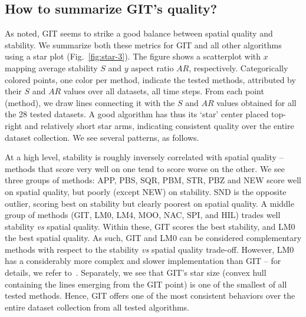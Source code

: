 \subsection{How to summarize GIT's quality?}
%
As noted, GIT seems to strike a good balance between spatial quality and stability. We summarize both these metrics for GIT and all other algorithms using a star plot (Fig.~\ref{fig:star-3}). The figure shows a scatterplot with $x$ mapping average stability $S$ and $y$ aspect ratio $AR$, respectively. Categorically colored points, one color per method, indicate the tested methods, attributed by their $S$ and $AR$ values over all datasets, all time steps. From each point (method), we draw lines connecting it with the $S$ and $AR$ values obtained for all the 28 tested datasets. A good algorithm has thus its `star' center placed top-right and relatively short star arms, indicating consistent quality over the entire dataset collection. We see several patterns, as follows.

At a high level, stability is roughly inversely correlated with spatial quality -- methods that score very well on one tend to score worse on the other. We see three groups of methods: APP, PBS, SQR, PBM, STR, PBZ and NEW score well on spatial quality, but poorly (except NEW) on stability. SND is the opposite outlier, scoring best on stability but clearly poorest on spatial quality. A middle group of methods (GIT, LM0, LM4, MOO, NAC, SPI, and HIL) trades well stability \emph{vs} spatial quality. Within these, GIT scores the best stability, and LM0 the best spatial quality. As such, GIT and LM0 can be considered complementary methods with respect to the stability \emph{vs} spatial quality trade-off. However, LM0 has a considerably more complex and slower implementation than GIT -- for details, we refer to~\citep{sondag17}. Separately, we see that GIT's star size (convex hull containing the lines emerging from the GIT point) is one of the smallest of all tested methods. Hence, GIT offers one of the most consistent behaviors over the entire dataset collection from all tested algorithms.

